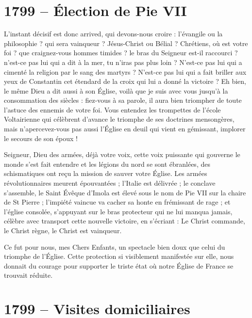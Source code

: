 \documentclass[11pt,a4paper]{report}
\begin{document}
\section*{1799 -- Élection de Pie VII}

L'instant décisif est donc arrived, qui devons-nous croire : l'évangile ou la philosophie ? qui sera vainqueur ? Jésus-Christ ou Bélial ? Chrétiens, où est votre foi ? que craignez-vous hommes timides ? le bras du Seigneur est-il raccourci ? n'est-ce pas lui qui a dit à la mer, tu n'iras pas plus loin ? N'est-ce pas lui qui a cimenté la religion par le sang des martyrs ? N'est-ce pas lui qui a fait briller aux yeux de Constantin cet étendard de la croix qui lui a donné la victoire ? Eh bien, le même Dieu a dit aussi à son Église, voilà que je suis avec vous jusqu'à la consommation des siècles : fiez-vous à sa parole, il aura bien triompher de toute l'astuce des ennemis de votre foi. Vous entendez les trompettes de l'école Voltairienne qui célèbrent d'avance le triomphe de ses doctrines mensongères, mais n'apercevez-vous pas aussi l'Église en deuil qui vient en gémissant, implorer le secours de son époux !

Seigneur, Dieu des armées, déjà votre voix, cette voix puissante qui gouverne le monde s'est fait entendre et les légions du nord se sont ébranlées, des schismatiques ont reçu la mission de sauver votre Église. Les armées révolutionnaires meurent épouvantées ; l'Italie est délivrée ; le conclave s'assemble, le Saint Évêque d'Imola est élevé sous le nom de Pie VII sur la chaire de St Pierre ; l'impiété vaincue va cacher sa honte en frémissant de rage ; et l'église consolée, s'appuyant sur le bras protecteur qui ne lui manqua jamais, célèbre avec transport cette nouvelle victoire, en s'écriant : Le Christ commande, le Christ règne, le Christ est vainqueur.

Ce fut pour nous, mes Chers Enfants, un spectacle bien doux que celui du triomphe de l'Église. Cette protection si visiblement manifestée sur elle, nous donnait du courage pour supporter le triste état où notre Église de France se trouvait réduite.

\section*{1799 -- Visites domiciliaires}
\end{document}
